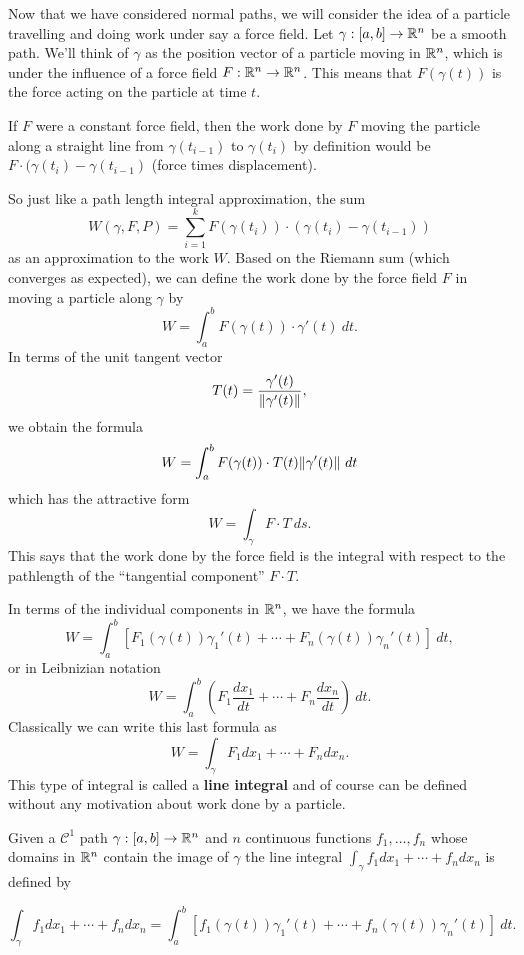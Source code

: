 Now that we have considered normal paths, we will consider the idea of a particle travelling and doing work under say a force field. Let $\gamma: [a,b] \to \mathbb{R}^n$ be a smooth path. We'll think of $\gamma$ as the position vector of a particle moving in $\mathbb{R}^n$, which is under the influence of a force field $F: \mathbb{R}^n \to \mathbb{R}^n$. This means that $F(\gamma(t))$ is the force acting on the particle at time $t$.

If $F$ were a constant force field, then the work done by $F$ moving the particle along a straight line from $\gamma(t_{i-1})$ to $\gamma(t_i)$ by definition would be $F \cdot (\gamma(t_i) - \gamma(t_{i-1})$ (force times displacement).

So just like a path length integral approximation, the sum
\[W(\gamma, F, P) = \sum_{i = 1}^kF(\gamma(t_i)) \cdot (\gamma(t_i) - \gamma(t_{i-1}))\]
as an approximation to the work $W$. Based on the Riemann sum (which converges as expected), we can define the work done by the force field $F$ in moving a particle along $\gamma$ by
\[W = \int_a^b F(\gamma(t)) \cdot \gamma'(t)~dt.\]
In terms of the unit tangent vector
\[T(t) = \frac{\gamma'(t)}{\norm{\gamma'(t)}},\]
we obtain the formula
\[W = \int_a^b F(\gamma(t)) \cdot T(t) \norm{\gamma'(t)}~dt\]
which has the attractive form
\[W = \int_{\gamma}F \cdot T~ds.\]
This says that the work done by the force field is the integral with respect to the pathlength of the ``tangential component'' $F \cdot T$.

In terms of the individual components in $\mathbb{R}^n$, we have the formula
\[W = \int_a^b [F_1(\gamma(t))\gamma_1'(t) + \cdots + F_n(\gamma(t))\gamma_n'(t)]~dt,\]
or in Leibnizian notation
\[W = \int_a^b \left(F_1\frac{dx_1}{dt} + \cdots + F_n\frac{dx_n}{dt}\right)~dt.\]
Classically we can write this last formula as
\[W = \int_{\gamma}F_1dx_1 + \cdots + F_ndx_n.\]
This type of integral is called a \textbf{line integral} and of course can be defined without any motivation about work done by a particle. 

\begin{definition}
Given a $\mathcal{C}^1$ path $\gamma:[a,b] \to \mathbb{R}^n$ and $n$ continuous functions $f_1, \dots, f_n$ whose domains in $\mathbb{R}^n$ contain the image of $\gamma$ the line integral $\int_{\gamma}f_1dx_1 + \cdots + f_ndx_n$ is defined by

\[\int_{\gamma}f_1dx_1 + \cdots + f_ndx_n = \int_a^b [f_1(\gamma(t))\gamma_1'(t) + \cdots + f_n(\gamma(t))\gamma_n'(t)]~dt.\]
\end{definition}

